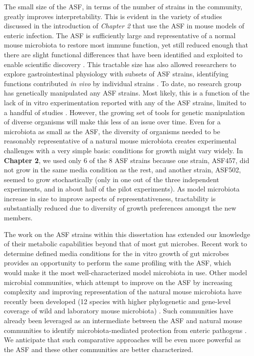 \documentclass[11pt,onecolumn,notitlepage,openany,twoside]{book}
\begin{document}
\begin{refsection}
The small size of the ASF, in terms of the number of strains in the community, greatly improves interpretability. This is evident in the variety of studies discussed in the introduction of \textit{Chapter 2} that use the ASF in mouse models of enteric infection. The ASF is sufficiently large and representative of a normal mouse microbiota to restore most immune function, yet still reduced enough that there are slight functional differences that have been identified and exploited to enable scientific discovery \cite{Ivanov2008-cl}. This tractable size has also allowed researchers to explore gastrointestinal physiology with subsets of ASF strains, identifying functions contributed \textit{in vivo} by individual strains \cite{Brugiroux2016-vi}. To date, no research group has genetically manipulated any ASF strains. Most likely, this is a function of the lack of in vitro experimentation reported with any of the ASF strains, limited to a handful of studies \cite{Biggs2017-fs,Loy2017-rb,Medlock2018-ub}. However, the growing set of tools for genetic manipulation of diverse organisms will make this less of an issue over time. Even for a microbiota as small as the ASF, the diversity of organisms needed to be reasonably representative of a natural mouse microbiota creates experimental challenges with a very simple basis: conditions for growth might vary widely. In \textbf{Chapter 2}, we used only 6 of the 8 ASF strains because one strain, ASF457, did not grow in the same media condition as the rest, and another strain, ASF502, seemed to grow stochastically (only in one out of the three independent experiments, and in about half of the pilot experiments). As model microbiota increase in size to improve aspects of representativeness, tractability is substantially reduced due to diversity of growth preferences amongst the new members.

The work on the ASF strains within this dissertation has extended our knowledge of their metabolic capabilities beyond that of most gut microbes. Recent work to determine defined media conditions for the in vitro growth of gut microbes provides an opportunity to perform the same profiling with the ASF, which would make it the most well-characterized model microbiota in use. Other model microbial communities, which attempt to improve on the ASF by increasing complexity and improving representation of the natural mouse microbiota have recently been developed (12 species with higher phylogenetic and gene-level coverage of wild and laboratory mouse microbiota) \cite{Garzetti2017-os}. Such communities have already been leveraged as an intermediate between the ASF and natural mouse communities to identify microbiota-mediated protection from enteric pathogens \cite{Brugiroux2016-vi}. We anticipate that such comparative approaches will be even more powerful as the ASF and these other communities are better characterized.


\end{refsection}
\end{document}
